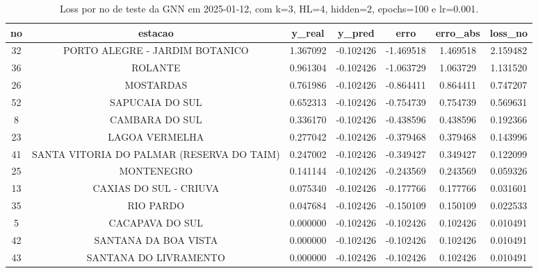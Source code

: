 \begin{table}[h]
\centering
\caption{Loss por no de teste da GNN em 2025-01-12, com k=3, HL=4, hidden=2, epochs=100 e lr=0.001.}
\label{tab:gnn_loss_k3_hl4_h2_e100_d20250112}
\begin{tabular}{ccccccc}
\toprule
no & estacao & y\_real & y\_pred & erro & erro\_abs & loss\_no \\
\midrule
32 & PORTO ALEGRE - JARDIM BOTANICO & 1.367092 & -0.102426 & -1.469518 & 1.469518 & 2.159482 \\
36 & ROLANTE & 0.961304 & -0.102426 & -1.063729 & 1.063729 & 1.131520 \\
26 & MOSTARDAS & 0.761986 & -0.102426 & -0.864411 & 0.864411 & 0.747207 \\
52 & SAPUCAIA DO SUL & 0.652313 & -0.102426 & -0.754739 & 0.754739 & 0.569631 \\
8 & CAMBARA DO SUL & 0.336170 & -0.102426 & -0.438596 & 0.438596 & 0.192366 \\
23 & LAGOA VERMELHA & 0.277042 & -0.102426 & -0.379468 & 0.379468 & 0.143996 \\
41 & SANTA VITORIA DO PALMAR (RESERVA DO TAIM) & 0.247002 & -0.102426 & -0.349427 & 0.349427 & 0.122099 \\
25 & MONTENEGRO & 0.141144 & -0.102426 & -0.243569 & 0.243569 & 0.059326 \\
13 & CAXIAS DO SUL - CRIUVA & 0.075340 & -0.102426 & -0.177766 & 0.177766 & 0.031601 \\
35 & RIO PARDO & 0.047684 & -0.102426 & -0.150109 & 0.150109 & 0.022533 \\
5 & CACAPAVA DO SUL & 0.000000 & -0.102426 & -0.102426 & 0.102426 & 0.010491 \\
42 & SANTANA DA BOA VISTA & 0.000000 & -0.102426 & -0.102426 & 0.102426 & 0.010491 \\
43 & SANTANA DO LIVRAMENTO & 0.000000 & -0.102426 & -0.102426 & 0.102426 & 0.010491 \\
\bottomrule
\end{tabular}
\end{table}
